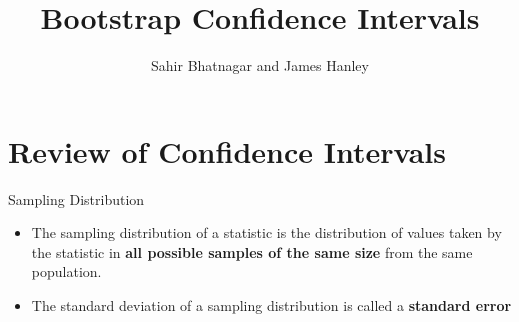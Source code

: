 \documentclass{beamer}\usepackage[]{graphicx}\usepackage[]{color}
\begin{document}




\title{Bootstrap Confidence Intervals}
\author{Sahir Bhatnagar and James Hanley}


\maketitle

\section{Review of Confidence Intervals}

\begin{frame}{Sampling Distribution}

\begin{defm}
	\begin{itemize}
		\item The sampling distribution of a statistic is the distribution of values taken by the statistic in \textbf{all possible samples of the same size} from the same population.
		\item The standard deviation of a sampling distribution is called a \textbf{standard error}
	\end{itemize} 
\end{defm}


\end{frame}
\end{document}
